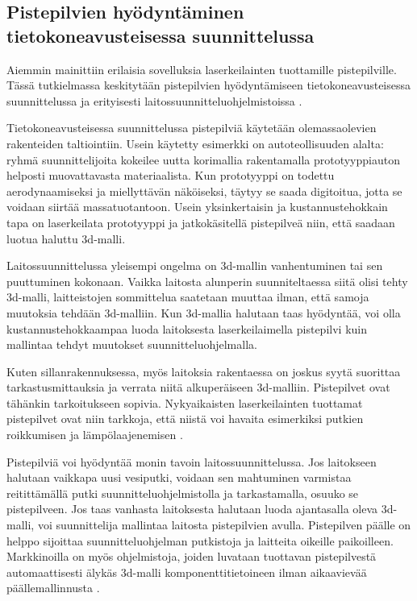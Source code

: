 \subsection{Pistepilvien hyödyntäminen tietokoneavusteisessa suunnittelussa}

Aiemmin mainittiin erilaisia sovelluksia laserkeilainten tuottamille pistepilville. Tässä tutkielmassa keskitytään pistepilvien hyödyntämiseen tietokoneavusteisessa suunnittelussa  ja erityisesti laitossuunnitteluohjelmistoissa .

Tietokoneavusteisessa suunnittelussa pistepilviä käytetään olemassaolevien rakenteiden taltiointiin. Usein käytetty esimerkki on autoteollisuuden alalta: ryhmä suunnittelijoita kokeilee uutta korimallia rakentamalla prototyyppiauton helposti muovattavasta materiaalista. Kun prototyyppi on todettu aerodynaamiseksi ja miellyttävän näköiseksi, täytyy se saada digitoitua, jotta se voidaan siirtää massatuotantoon. Usein yksinkertaisin ja kustannustehokkain tapa on laserkeilata prototyyppi ja jatkokäsitellä pistepilveä niin, että saadaan luotua haluttu 3d-malli.

Laitossuunnittelussa yleisempi ongelma on 3d-mallin vanhentuminen tai sen puuttuminen kokonaan. Vaikka laitosta alunperin suunniteltaessa siitä olisi tehty 3d-malli, laitteistojen sommittelua saatetaan muuttaa ilman, että samoja muutoksia tehdään 3d-malliin. Kun 3d-mallia halutaan taas hyödyntää, voi olla kustannustehokkaampaa luoda laitoksesta laserkeilaimella pistepilvi kuin mallintaa tehdyt muutokset suunnitteluohjelmalla. \cite{Piipponen}

Kuten sillanrakennuksessa, myös laitoksia rakentaessa on joskus syytä suorittaa tarkastusmittauksia ja verrata niitä alkuperäiseen 3d-malliin. Pistepilvet ovat tähänkin tarkoitukseen sopivia. Nykyaikaisten laserkeilainten tuottamat pistepilvet ovat niin tarkkoja, että niistä voi havaita esimerkiksi putkien roikkumisen ja lämpölaajenemisen \cite{Piipponen}. 

Pistepilviä voi hyödyntää monin tavoin laitossuunnittelussa. Jos laitokseen halutaan vaikkapa uusi vesiputki, voidaan sen mahtuminen varmistaa reitittämällä putki suunnitteluohjelmistolla ja tarkastamalla, osuuko se pistepilveen. Jos taas vanhasta laitoksesta halutaan luoda ajantasalla oleva 3d-malli, voi suunnittelija mallintaa laitosta pistepilvien avulla. Pistepilven päälle on helppo sijoittaa suunnitteluohjelman putkistoja ja laitteita oikeille paikoilleen. Markkinoilla on myös ohjelmistoja, joiden luvataan tuottavan pistepilvestä automaattisesti älykäs 3d-malli komponenttitietoineen ilman aikaavievää päällemallinnusta \cite{aveva}. 

